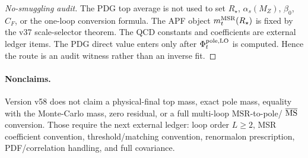 \begin{proof}[No-smuggling audit]
The PDG top average is not used to set \(R_\star\), \(\alpha_s(M_Z)\), \(\beta_0\),
\(C_F\), or the one-loop conversion formula.  The APF object \(m_t^{\rm MSR}(R_\star)\)
is fixed by the v37 scale-selector theorem.  The QCD constants and coefficients are
external ledger items.  The PDG direct value enters only after \(\Phi_t^{\rm pole,LO}\)
is computed.  Hence the route is an audit witness rather than an inverse fit.
\end{proof}

\paragraph{Nonclaims.}
Version v58 does not claim a physical-final top mass, exact pole mass, equality with
the Monte-Carlo mass, zero residual, or a full multi-loop \(\mathrm{MSR}\)-to-pole/
\(\overline{\rm MS}\) conversion.  Those require the next external ledger: loop
order \(L\ge2\), MSR coefficient convention, threshold/matching convention,
renormalon prescription, PDF/correlation handling, and full covariance.
